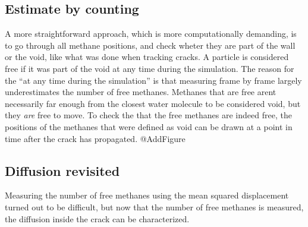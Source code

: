 \subsection{Estimate by counting}
A more straightforward approach, which is more computationally demanding, is to go through all methane positions, and check wheter they are part of the wall or the void, like what was done when tracking cracks. A particle is considered free if it was part of the void at any time during the simulation. The reason for the ``at any time during the simulation'' is that measuring frame by frame largely underestimates the number of free methanes. Methanes that are free arent necessarily far enough from the closest water molecule to be considered void, but they \emph{are} free to move. To check the that the free methanes are indeed free, the positions of the methanes that were defined as void can be drawn at a point in time after the crack has propagated. @AddFigure

\subsection{Diffusion revisited}
Measuring the number of free methanes using the mean squared displacement turned out to be difficult, but now that the number of free methanes is measured, the diffusion inside the crack can be characterized.
